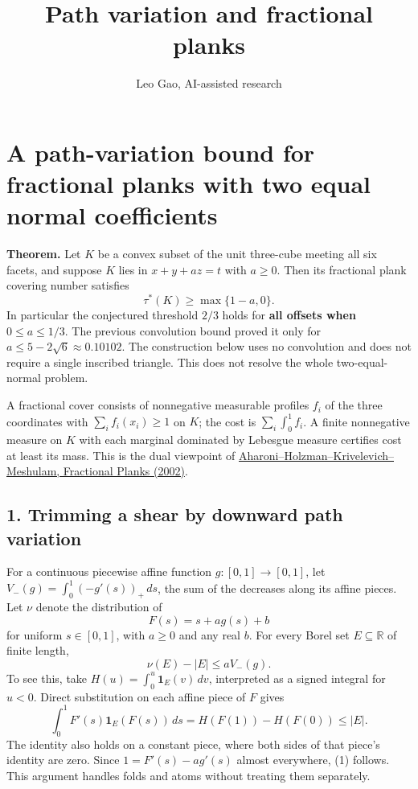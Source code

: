 \documentclass[
  10pt,
]{article}
\title{Path variation and fractional planks}
\author{Leo Gao, AI-assisted research}
\date{}
\begin{document}
\maketitle

\section{A path-variation bound for fractional planks with two equal
normal
coefficients}\label{a-path-variation-bound-for-fractional-planks-with-two-equal-normal-coefficients}



\textbf{Theorem.} Let \(K\) be a convex subset of the unit three-cube
meeting all six facets, and suppose \(K\) lies in \(x+y+az=t\) with
\(a\ge0\). Then its fractional plank covering number satisfies \[
\tau^*(K)\ge \max\{1-a,0\}.
\] In particular the conjectured threshold \(2/3\) holds for \textbf{all
offsets when \(0\le a\le1/3\)}. The previous convolution bound proved it
only for \(a\le5-2\sqrt6\approx0.10102\). The construction below uses no
convolution and does not require a single inscribed triangle. This does
not resolve the whole two-equal-normal problem.

A fractional cover consists of nonnegative measurable profiles \(f_i\)
of the three coordinates with \(\sum_i f_i(x_i)\ge1\) on \(K\); the cost
is \(\sum_i\int_0^1 f_i\). A finite nonnegative measure on \(K\) with
each marginal dominated by Lebesgue measure certifies cost at least its
mass. This is the dual viewpoint of
\href{https://doi.org/10.1007/s00454-001-0088-x}{Aharoni--Holzman--Krivelevich--Meshulam,
Fractional Planks (2002)}.

\subsection{1. Trimming a shear by downward path
variation}\label{trimming-a-shear-by-downward-path-variation}

For a continuous piecewise affine function \(g:[0,1]\to[0,1]\), let
\(V_-(g)=\int_0^1(-g'(s))_+\,ds\), the sum of the decreases along its
affine pieces. Let \(\nu\) denote the distribution of \[
F(s)=s+a g(s)+b
\] for uniform \(s\in[0,1]\), with \(a\ge0\) and any real \(b\). For
every Borel set \(E\subseteq\mathbb R\) of finite length, \[
\nu(E)-|E|\le aV_-(g). \tag{1}
\] To see this, take \(H(u)=\int_0^u\mathbf 1_E(v)\,dv\), interpreted as
a signed integral for \(u<0\). Direct substitution on each affine piece
of \(F\) gives \[
\int_0^1 F'(s)\mathbf 1_E(F(s))\,ds
 =H(F(1))-H(F(0))\le |E|.
\] The identity also holds on a constant piece, where both sides of that
piece's identity are zero. Since \(1=F'(s)-ag'(s)\) almost everywhere,
(1) follows. This argument handles folds and atoms without treating them
separately.
\end{document}
